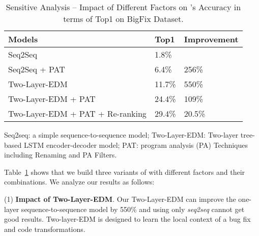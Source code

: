 \iffalse

\begin{table}[h]
	\caption{Sensitive Analysis -- Impact of Different Factors on {\tool}'s Accuracy in terms of Top1 on BigFix Dataset. 
	}
	\vspace{-10pt}
	\begin{center}
		\renewcommand{\arraystretch}{1} 
		\begin{tabular}{l|p{0.7cm}<{\centering}|p{1.5cm}<{\centering}}
			\hline
			Models & Top1 & Improvement\\
			\hline
			Seq2Seq & 1.8\% & \\
			Seq2Seq + PAT & 6.4\% & 256\% \\ 
			Two-Layer-EDM & 11.7\% & 550\%\\
			Two-Layer-EDM + PAT &  24.4\% &109\%\\
			Two-Layer-EDM + PAT + Re-ranking & 29.4\%&20.5\% \\
			\hline
		\end{tabular}
	Seq2seq: a simple sequence-to-sequence model; Two-Layer-EDM: Two-layer tree-based LSTM encoder-decoder model; 
	PAT: program analysis (PA) Techniques including Renaming and PA Filters.
		\label{RQ3}
	\end{center}
\end{table}


Table~\ref{RQ3} shows that we build three variants of {\tool} with
different factors and their combinations.  We analyze our results as
follows:

(1) \textbf{Impact of Two-Layer-EDM}. Our Two-Layer-EDM
can improve the one-layer sequence-to-sequence model by 550\% and
using only {\em seq2seq} cannot get good results. Two-layer-EDM is
designed to learn the local context of a bug fix and code
transformations.

